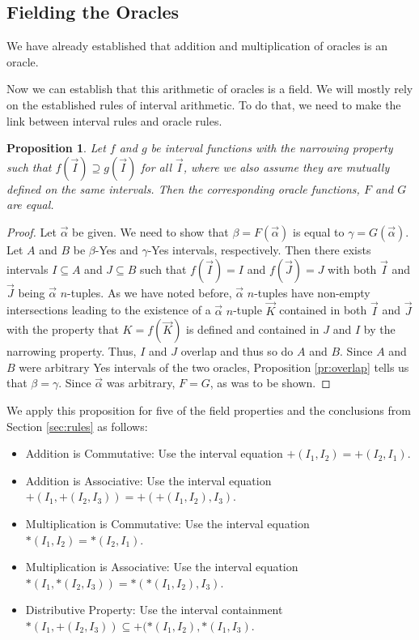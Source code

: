 \documentclass[12pt]{article}
\newtheorem{proposition}{Proposition}
\theoremstyle{remark}
\begin{document}
\subsection{Fielding the Oracles}

We have already established that addition and multiplication of oracles is an oracle. 


Now we can establish that this arithmetic of oracles is a field. We will mostly rely on the established rules of interval arithmetic. To do that, we need to make the link between interval rules and oracle rules. 


\begin{proposition}
Let $f$ and $g$ be interval functions with the narrowing property such that $f(\vec{I}) \supseteq g(\vec{I})$ for all $\vec{I}$, where we also assume they are mutually defined on the same intervals. Then the corresponding oracle functions, $F$ and $G$ are equal.  
\end{proposition}

\begin{proof}
Let $\vec{\alpha}$ be given. We need to show that $\beta = F(\vec{\alpha})$ is equal to $\gamma =  G(\vec{\alpha})$. Let $A$ and $B$ be $\beta$-Yes and $\gamma$-Yes intervals, respectively. Then there exists intervals $I \subseteq A$ and  $J \subseteq B$  such that $f(\vec{I}) = I$ and $f(\vec{J}) = J$ with both  $\vec{I}$ and $\vec{J}$ being $\vec{\alpha}$ $n$-tuples. As we have noted before, $\vec{\alpha}$ $n$-tuples have non-empty intersections leading to the existence of a $\vec{\alpha}$ $n$-tuple $\vec{K}$ contained in both $\vec{I}$ and $\vec{J}$ with the property that $K = f(\vec{K})$ is defined and contained in $J$ and $I$ by the narrowing property. Thus, $I$ and $J$ overlap and thus so do $A$ and $B$. Since $A$ and $B$ were arbitrary Yes intervals of the two oracles, Proposition \ref{pr:overlap} tells us that $\beta = \gamma$. Since $\vec{\alpha}$ was arbitrary, $F = G$, as was to be shown.
\end{proof}

We apply this proposition for five of the field properties and the conclusions from Section \ref{sec:rules} as follows: 

\begin{itemize}
    \item Addition is Commutative:  Use the interval equation $+(I_1, I_2) = +(I_2, I_1)$.
    \item Addition is Associative: Use the interval equation $+(I_1, +(I_2, I_3)) = +(+(I_1, I_2), I_3)$.
    \item Multiplication is Commutative: Use the interval equation $*(I_1, I_2) = *(I_2, I_1)$.
    \item Multiplication is Associative: Use the interval equation $*(I_1, *(I_2, I_3)) = *(*(I_1, I_2), I_3)$.
    \item Distributive Property: Use the interval containment $*(I_1, +(I_2, I_3)) \subseteq +(*(I_1, I_2), *(I_1, I_3)$.
\end{itemize}
\end{document}
